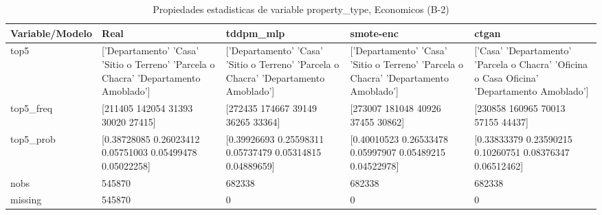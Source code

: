 \begin{table}[H]
\centering
\fontsize{8}{14}\selectfont
\caption{Propiedades  estadisticas de variable property\_type, Economicos (B-2)}
\label{table-stats-economicos-b-2-property_type}
\begin{tabular}{|l|m{10em}|m{10em}|m{10em}|m{10em}|}
\hline
 \rowcolor[gray]{0.8}
Variable/Modelo & Real & tddpm\_mlp & smote-enc & ctgan \\
\hline top5 & ['Departamento' 'Casa' 'Sitio o Terreno' 'Parcela o Chacra'
 'Departamento Amoblado'] & ['Departamento' 'Casa' 'Sitio o Terreno' 'Parcela o Chacra'
 'Departamento Amoblado'] & ['Departamento' 'Casa' 'Sitio o Terreno' 'Parcela o Chacra'
 'Departamento Amoblado'] & ['Casa' 'Departamento' 'Parcela o Chacra' 'Oficina o Casa Oficina'
 'Departamento Amoblado'] \\
\hline top5\_freq & [211405 142054  31393  30020  27415] & [272435 174667  39149  36265  33364] & [273007 181048  40926  37455  30862] & [230858 160965  70013  57155  44437] \\
\hline top5\_prob & [0.38728085 0.26023412 0.05751003 0.05499478 0.05022258] & [0.39926693 0.25598311 0.05737479 0.05314815 0.04889659] & [0.40010523 0.26533478 0.05997907 0.05489215 0.04522978] & [0.33833379 0.23590215 0.10260751 0.08376347 0.06512462] \\
\hline nobs & 545870 & 682338 & 682338 & 682338 \\
\hline missing & 545870 & 0 & 0 & 0 \\
\hline
\end{tabular}
\end{table}
